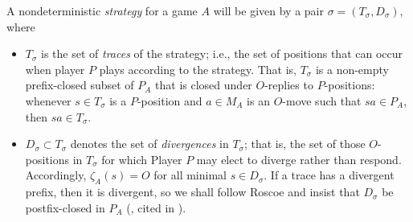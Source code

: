 \documentclass{article}
\begin{document}
A nondeterministic \emph{strategy} for a game $A$ will be given by a pair $\sigma=(T_\sigma, D_\sigma)$, where
\begin{itemize}
  \item $T_\sigma$ is the set of \emph{traces} of the strategy; i.e., the set of positions that can occur when player $P$ plays according to the strategy.  That is, $T_\sigma$ is a non-empty prefix-closed subset of $P_A$ that is closed under $O$-replies to $P$-positions: whenever $s\in T_\sigma$ is a $P$-position and $a\in M_A$ is an $O$-move such that $sa\in P_A$, then $sa\in T_\sigma$.  

  \item $D_\sigma\subset T_\sigma$ denotes the set of \emph{divergences} in $T_\sigma$; that is, the set of those $O$-positions in $T_\sigma$ for which Player $P$ may elect to diverge rather than respond.  Accordingly, $\zeta_A(s)=O$ for all minimal $s\in D_\sigma$.  If a trace has a divergent prefix, then it is divergent, so we shall follow Roscoe and insist that $D_\sigma$ be postfix-closed in $P_A$ (\cite{RoscoeCspInfinite}, cited in \cite{mcCHFiniteND}).
\end{itemize}
\end{document}
